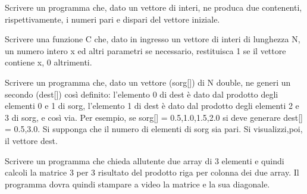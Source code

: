 Scrivere un programma che, dato un vettore di interi, ne produca due contenenti, rispettivamente, i numeri pari e dispari del vettore iniziale. 

Scrivere una funzione C che, dato in ingresso un vettore di interi di lunghezza N, un numero intero x ed altri parametri se necessario, restituisca 1 se il vettore contiene x, 0 altrimenti.

Scrivere un programma che, dato un vettore (sorg[]) di N double, ne generi un secondo (dest[]) così definito: l'elemento 0 di dest è dato dal prodotto degli elementi 0 e 1 di sorg, l'elemento 1 di dest è dato dal prodotto degli elementi 2 e 3 di sorg, e così via. Per esempio, se sorg[] = {0.5,1.0,1.5,2.0} si deve generare dest[] = {0.5,3.0}.
Si supponga che il numero di elementi di sorg sia pari. Si visualizzi,poi, il vettore dest. 

Scrivere un programma che chieda allutente due array di 3 elementi e
quindi calcoli la matrice 3 per 3 risultato del prodotto riga per colonna dei
due array.  Il programma dovra quindi stampare a video la matrice e la sua
diagonale.